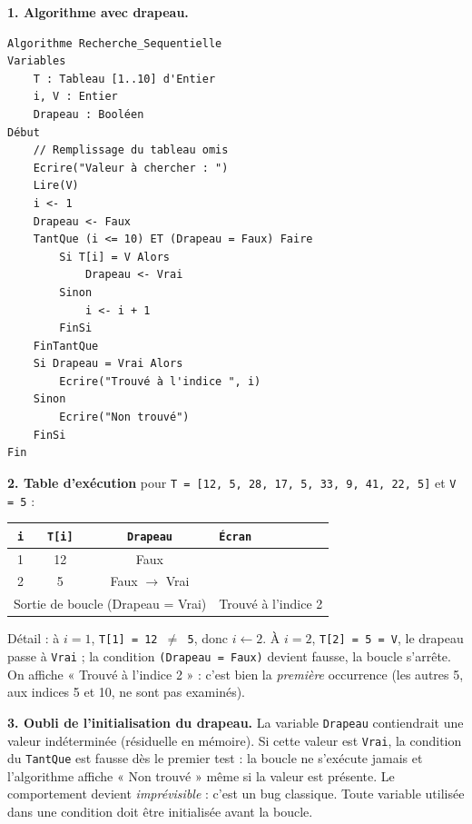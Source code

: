 \documentclass[11pt]{article}
\begin{document}
\begin{corrige}
\textbf{1. Algorithme avec drapeau.}
\begin{lstlisting}
Algorithme Recherche_Sequentielle
Variables
    T : Tableau [1..10] d'Entier
    i, V : Entier
    Drapeau : Booléen
Début
    // Remplissage du tableau omis
    Ecrire("Valeur à chercher : ")
    Lire(V)
    i <- 1
    Drapeau <- Faux
    TantQue (i <= 10) ET (Drapeau = Faux) Faire
        Si T[i] = V Alors
            Drapeau <- Vrai
        Sinon
            i <- i + 1
        FinSi
    FinTantQue
    Si Drapeau = Vrai Alors
        Ecrire("Trouvé à l'indice ", i)
    Sinon
        Ecrire("Non trouvé")
    FinSi
Fin
\end{lstlisting}

\textbf{2. Table d'exécution} pour \texttt{T = [12, 5, 28, 17, 5, 33, 9, 41, 22, 5]} et \texttt{V = 5} :

\begin{center}
\begin{tabularx}{\linewidth}{|c|c|c|X|}
\hline
\rowcolor{popblueL}
\texttt{i} & \texttt{T[i]} & \texttt{Drapeau} & \texttt{Écran} \\
\hline
1 & 12 & Faux & \\
\hline
2 & 5 & Faux $\rightarrow$ Vrai & \\
\hline
\multicolumn{3}{|l|}{Sortie de boucle (Drapeau = Vrai)} & Trouvé à l'indice 2 \\
\hline
\end{tabularx}
\end{center}

Détail : à $i = 1$, \texttt{T[1] = 12 $\ne$ 5}, donc $i \leftarrow 2$. À $i = 2$, \texttt{T[2] = 5 = V}, le drapeau passe à \texttt{Vrai} ; la condition \texttt{(Drapeau = Faux)} devient fausse, la boucle s'arrête. On affiche « Trouvé à l'indice 2 » : c'est bien la \emph{première} occurrence (les autres 5, aux indices 5 et 10, ne sont pas examinés).

\textbf{3. Oubli de l'initialisation du drapeau.} La variable \texttt{Drapeau} contiendrait une valeur indéterminée (résiduelle en mémoire). Si cette valeur est \texttt{Vrai}, la condition du \texttt{TantQue} est fausse dès le premier test : la boucle ne s'exécute jamais et l'algorithme affiche « Non trouvé » même si la valeur est présente. Le comportement devient \emph{imprévisible} : c'est un bug classique. Toute variable utilisée dans une condition doit être initialisée avant la boucle.
\end{corrige}
\end{document}
